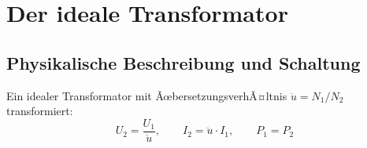 ﻿\documentclass[12pt, a4paper]{article}
\begin{document}
	\section{Der ideale Transformator}
	
	\subsection{Physikalische Beschreibung und Schaltung}
	
	Ein idealer Transformator mit ÃœbersetzungsverhÃ¤ltnis $\ddot{u} = N_1 / N_2$ transformiert:
	\begin{equation}
		U_2 = \frac{U_1}{\ddot{u}}, \qquad I_2 = \ddot{u} \cdot I_1, \qquad P_1 = P_2
		\label{eq:trafo}
	\end{equation}
	
\end{document}
